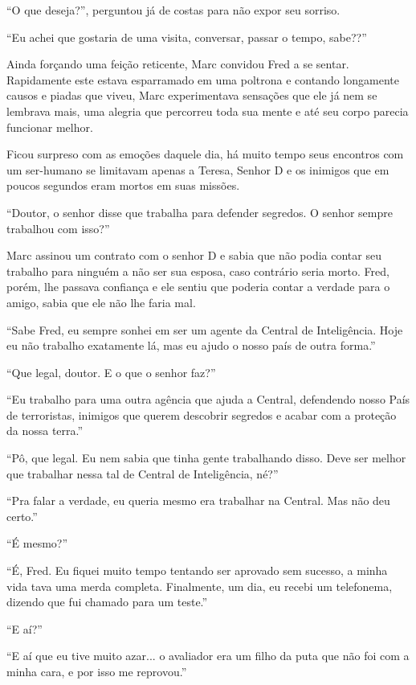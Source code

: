 ``O que deseja?'', perguntou já de costas para não expor seu sorriso.

``Eu achei que gostaria de uma visita, conversar, passar o tempo,
sabe??''

Ainda forçando uma feição reticente, Marc convidou Fred a se sentar.\\
Rapidamente este estava esparramado em uma poltrona e contando
longamente causos e piadas que viveu, Marc experimentava sensações que
ele já nem se lembrava mais, uma alegria que percorreu toda sua mente e
até seu corpo parecia funcionar melhor.

Ficou surpreso com as emoções daquele dia, há muito tempo seus encontros
com um ser-humano se limitavam apenas a Teresa, Senhor D e os inimigos
que em poucos segundos eram mortos em suas missões.

``Doutor, o senhor disse que trabalha para defender segredos. O senhor
sempre trabalhou com isso?''

Marc assinou um contrato com o senhor D e sabia que não podia contar seu
trabalho para ninguém a não ser sua esposa, caso contrário seria morto.
Fred, porém, lhe passava confiança e ele sentiu que poderia contar a
verdade para o amigo, sabia que ele não lhe faria mal.

``Sabe Fred, eu sempre sonhei em ser um agente da Central de
Inteligência. Hoje eu não trabalho exatamente lá, mas eu ajudo o nosso
país de outra forma.''

``Que legal, doutor. E o que o senhor faz?''

``Eu trabalho para uma outra agência que ajuda a Central, defendendo
nosso País de terroristas, inimigos que querem descobrir segredos e
acabar com a proteção da nossa terra.''

``Pô, que legal. Eu nem sabia que tinha gente trabalhando disso. Deve
ser melhor que trabalhar nessa tal de Central de Inteligência, né?''

``Pra falar a verdade, eu queria mesmo era trabalhar na Central. Mas não
deu certo.''

``É mesmo?''

``É, Fred. Eu fiquei muito tempo tentando ser aprovado sem sucesso, a
minha vida tava uma merda completa. Finalmente, um dia, eu recebi um
telefonema, dizendo que fui chamado para um teste.''

``E aí?''

``E aí que eu tive muito azar... o avaliador era um filho da puta que
não foi com a minha cara, e por isso me reprovou.''

